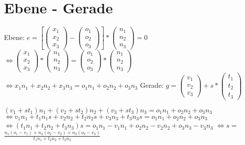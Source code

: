 \documentclass[12pt,a4paper]{article}
\begin{document}
\section*{Ebene - Gerade}
Ebene: $e = \left[\left(\begin{array}{c} x_1 \\ x_2 \\ x_3 \end{array}\right) - \left(\begin{array}{c} o_1 \\ o_2 \\ o_3 \end{array}\right)\right] * \left(\begin{array}{c} n_1 \\ n_2 \\ n_3 \end{array}\right) = 0$\newline
$\Leftrightarrow  \left(\begin{array}{c} x_1 \\ x_2 \\ x_3 \end{array}\right) * \left(\begin{array}{c} n_1 \\ n_2 \\ n_3 \end{array}\right) = \left(\begin{array}{c} o_1 \\ o_2 \\ o_3 \end{array}\right)* \left(\begin{array}{c} n_1 \\ n_2 \\ n_3 \end{array}\right)$\newline
$\Leftrightarrow x_1n_1 + x_2n_2 + x_3n_3 = o_1n_1 + o_2n_2 + o_3n_3$\newline
Gerade: $g = \left(\begin{array}{c} v_1 \\ v_2 \\ v_3 \end{array}\right) + s*
\left(\begin{array}{c} t_1 \\ t_2 \\ t_3 \end{array}\right)$\newline\newline
\begin{doublespace}
    $(v_1 + st_1)n_1 + (v_2 + st_2)n_2 + (v_3 + st_3)n_3 = o_1n_1 + o_2n_2 + o_3n_3$\newline
    $\Leftrightarrow v_1n_1 + t_1n_1s + v_2n_2 + t_2n_2s + v_3n_3 + t_3n_3s =o_1n_1 + o_2n_2 + o_3n_3$\newline
    $\Leftrightarrow (t_1n_1 + t_2n_2 + t_3n_3)s =  o_1n_1 - v_1n_1 + o_2n_2 - v_2n_2 + o_3n_3 - v_3n_3$\newline
    $\Leftrightarrow s =$ {\Large$\frac{n_1(o_1 - v_1) + n_2(o_2 - v_2) + n_3(o_3 - v_3)}{t_1n_1 + t_2n_2 + t_3n_3}$}
\end{doublespace}
\end{document}
